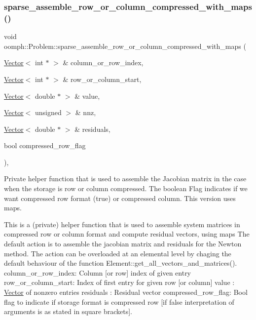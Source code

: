 \subsubsection{\texorpdfstring{sparse\+\_\+assemble\+\_\+row\+\_\+or\+\_\+column\+\_\+compressed\+\_\+with\+\_\+maps()}{sparse\_assemble\_row\_or\_column\_compressed\_with\_maps()}}
{\footnotesize\ttfamily void oomph\+::\+Problem\+::sparse\+\_\+assemble\+\_\+row\+\_\+or\+\_\+column\+\_\+compressed\+\_\+with\+\_\+maps (\begin{DoxyParamCaption}\item[{\hyperlink{classoomph_1_1Vector}{Vector}$<$ int $\ast$ $>$ \&}]{column\+\_\+or\+\_\+row\+\_\+index,  }\item[{\hyperlink{classoomph_1_1Vector}{Vector}$<$ int $\ast$ $>$ \&}]{row\+\_\+or\+\_\+column\+\_\+start,  }\item[{\hyperlink{classoomph_1_1Vector}{Vector}$<$ double $\ast$ $>$ \&}]{value,  }\item[{\hyperlink{classoomph_1_1Vector}{Vector}$<$ unsigned $>$ \&}]{nnz,  }\item[{\hyperlink{classoomph_1_1Vector}{Vector}$<$ double $\ast$ $>$ \&}]{residuals,  }\item[{bool}]{compressed\+\_\+row\+\_\+flag }\end{DoxyParamCaption})\hspace{0.3cm}{\ttfamily [private]}, {\ttfamily [virtual]}}



Private helper function that is used to assemble the Jacobian matrix in the case when the storage is row or column compressed. The boolean Flag indicates if we want compressed row format (true) or compressed column. This version uses maps. 

This is a (private) helper function that is used to assemble system matrices in compressed row or column format and compute residual vectors, using maps The default action is to assemble the jacobian matrix and residuals for the Newton method. The action can be overloaded at an elemental level by chaging the default behaviour of the function Element\+::get\+\_\+all\+\_\+vectors\+\_\+and\+\_\+matrices(). column\+\_\+or\+\_\+row\+\_\+index\+: Column \mbox{[}or row\mbox{]} index of given entry row\+\_\+or\+\_\+column\+\_\+start\+: Index of first entry for given row \mbox{[}or column\mbox{]} value \+: \hyperlink{classoomph_1_1Vector}{Vector} of nonzero entries residuals \+: Residual vector compressed\+\_\+row\+\_\+flag\+: Bool flag to indicate if storage format is compressed row \mbox{[}if false interpretation of arguments is as stated in square brackets\mbox{]}. 

